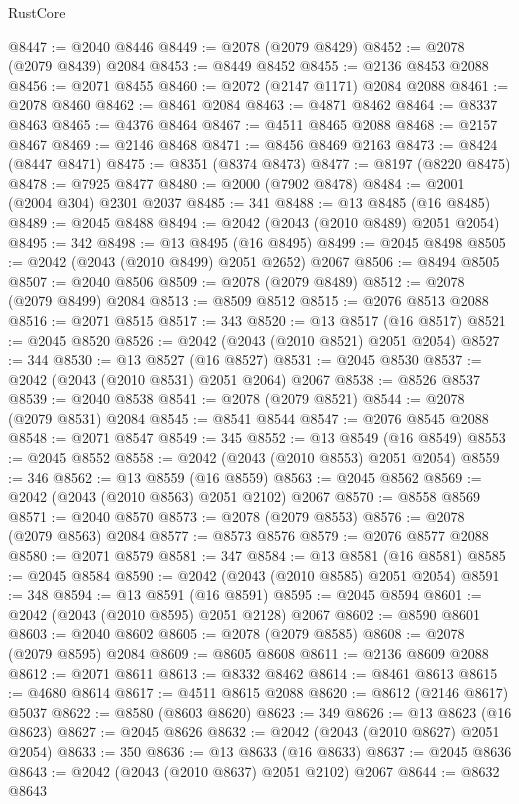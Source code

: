 \begin{lexlean}{RustCore}
\begin{coremodule}
@8447 := @2040 @8446
@8449 := @2078 (@2079 @8429)
@8452 := @2078 (@2079 @8439) @2084
@8453 := @8449 @8452
@8455 := @2136 @8453 @2088
@8456 := @2071 @8455
@8460 := @2072 (@2147 @1171) @2084 @2088
@8461 := @2078 @8460
@8462 := @8461 @2084
@8463 := @4871 @8462
@8464 := @8337 @8463
@8465 := @4376 @8464
@8467 := @4511 @8465 @2088
@8468 := @2157 @8467
@8469 := @2146 @8468
@8471 := @8456 @8469 @2163
@8473 := @8424 (@8447 @8471)
@8475 := @8351 (@8374 @8473)
@8477 := @8197 (@8220 @8475)
@8478 := @7925 @8477
@8480 := @2000 (@7902 @8478)
@8484 := @2001 (@2004 @304) @2301 @2037
@8485 := 341
@8488 := @13 @8485 (@16 @8485)
@8489 := @2045 @8488
@8494 := @2042 (@2043 (@2010 @8489) @2051 @2054)
@8495 := 342
@8498 := @13 @8495 (@16 @8495)
@8499 := @2045 @8498
@8505 := @2042 (@2043 (@2010 @8499) @2051 @2652) @2067
@8506 := @8494 @8505
@8507 := @2040 @8506
@8509 := @2078 (@2079 @8489)
@8512 := @2078 (@2079 @8499) @2084
@8513 := @8509 @8512
@8515 := @2076 @8513 @2088
@8516 := @2071 @8515
@8517 := 343
@8520 := @13 @8517 (@16 @8517)
@8521 := @2045 @8520
@8526 := @2042 (@2043 (@2010 @8521) @2051 @2054)
@8527 := 344
@8530 := @13 @8527 (@16 @8527)
@8531 := @2045 @8530
@8537 := @2042 (@2043 (@2010 @8531) @2051 @2064) @2067
@8538 := @8526 @8537
@8539 := @2040 @8538
@8541 := @2078 (@2079 @8521)
@8544 := @2078 (@2079 @8531) @2084
@8545 := @8541 @8544
@8547 := @2076 @8545 @2088
@8548 := @2071 @8547
@8549 := 345
@8552 := @13 @8549 (@16 @8549)
@8553 := @2045 @8552
@8558 := @2042 (@2043 (@2010 @8553) @2051 @2054)
@8559 := 346
@8562 := @13 @8559 (@16 @8559)
@8563 := @2045 @8562
@8569 := @2042 (@2043 (@2010 @8563) @2051 @2102) @2067
@8570 := @8558 @8569
@8571 := @2040 @8570
@8573 := @2078 (@2079 @8553)
@8576 := @2078 (@2079 @8563) @2084
@8577 := @8573 @8576
@8579 := @2076 @8577 @2088
@8580 := @2071 @8579
@8581 := 347
@8584 := @13 @8581 (@16 @8581)
@8585 := @2045 @8584
@8590 := @2042 (@2043 (@2010 @8585) @2051 @2054)
@8591 := 348
@8594 := @13 @8591 (@16 @8591)
@8595 := @2045 @8594
@8601 := @2042 (@2043 (@2010 @8595) @2051 @2128) @2067
@8602 := @8590 @8601
@8603 := @2040 @8602
@8605 := @2078 (@2079 @8585)
@8608 := @2078 (@2079 @8595) @2084
@8609 := @8605 @8608
@8611 := @2136 @8609 @2088
@8612 := @2071 @8611
@8613 := @8332 @8462
@8614 := @8461 @8613
@8615 := @4680 @8614
@8617 := @4511 @8615 @2088
@8620 := @8612 (@2146 @8617) @5037
@8622 := @8580 (@8603 @8620)
@8623 := 349
@8626 := @13 @8623 (@16 @8623)
@8627 := @2045 @8626
@8632 := @2042 (@2043 (@2010 @8627) @2051 @2054)
@8633 := 350
@8636 := @13 @8633 (@16 @8633)
@8637 := @2045 @8636
@8643 := @2042 (@2043 (@2010 @8637) @2051 @2102) @2067
@8644 := @8632 @8643

\end{coremodule}
\end{lexlean}

